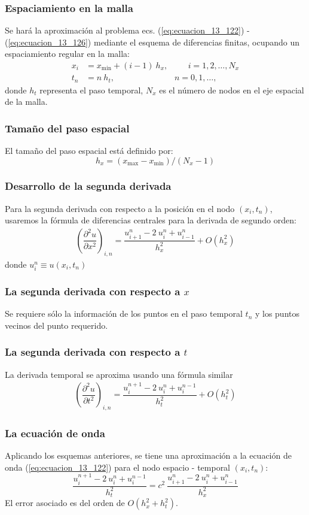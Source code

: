 \begin{frame}
\frametitle{Espaciamiento en la malla}
Se hará la aproximación al problema ecs. (\ref{eq:ecuacion_13_122}) - (\ref{eq:ecuacion_13_126}) mediante el esquema de diferencias finitas, ocupando un espaciamiento regular en la malla:
\begin{align}
 x_{i} &= x_{\text{min}} + (i - 1) \: h_{x}, \hspace{1cm} i = 1, 2, \ldots, N_{x} \label{eq:ecuacion_13_127} \\
 t_{n} &= n \: h_{t}, \hspace{3cm} n = 0, 1, \ldots, \label{eq:ecuacion_13_128}
 \end{align}
 donde $h_{t}$ representa el paso temporal, $N_{x}$ es el número de nodos en el eje espacial de la malla.
\end{frame}
\begin{frame}
\frametitle{Tamaño del paso espacial}
El tamaño del paso espacial está definido por:
\begin{equation}
h_{x} = (x_{\text{max}} - x_{\text{min}}) / (N_{x} - 1)
\label{eq:ecuacion_13_129}
\end{equation}
\end{frame}
\begin{frame}
\frametitle{Desarrollo de la segunda derivada}
Para la segunda derivada con respecto a la posición en el nodo $(x_{i}, t_{n})$, usaremos la fórmula de diferencias centrales para la derivada de segundo orden:
\begin{align*}
\left( \dfrac{\partial^{2} u }{\partial x^{2}} \right)_{i,n} = \dfrac{u_{i+1}^{n} -2 \: u_{i}^{n} + u_{i-1}^{n}}{h_{x}^{2}} + O(h_{x}^{2})
\end{align*}
donde $u_{i}^{n} \equiv u(x_{i}, t_{n})$
\end{frame}
\begin{frame}
\frametitle{La segunda derivada con respecto a $x$}
Se requiere sólo la información de los puntos en el paso temporal $t_{n}$ y los puntos vecinos del punto requerido. 
\end{frame}
\begin{frame}
\frametitle{La segunda derivada con respecto a $t$}
La derivada temporal se aproxima usando una fórmula similar
\begin{align*}
\left( \dfrac{\partial^{2} u }{\partial t^{2}} \right)_{i,n} = \dfrac{u_{i}^{n+1} -2 \: u_{i}^{n} + u_{i}^{n-1}}{h_{t}^{2}} + O(h_{t}^{2})
\end{align*}
\end{frame}
\begin{frame}
\frametitle{La ecuación de onda}
Aplicando los esquemas anteriores, se tiene una aproximación a la ecuación de onda (\ref{eq:ecuacion_13_122}) para el nodo espacio - temporal $(x_{i}, t_{n})$:
\begin{equation}
\dfrac{u_{i}^{n+1} -2 \: u_{i}^{n} + u_{i}^{n-1}}{h_{t}^{2}} =  c^{2} \: \dfrac{u_{i+1}^{n} -2 \: u_{i}^{n} + u_{i-1}^{n}}{h_{x}^{2}}
\label{eq:ecuacion_13_130}
\end{equation}
El error asociado es del orden de $O(h_{x}^{2} + h_{t}^{2})$.
\end{frame}
